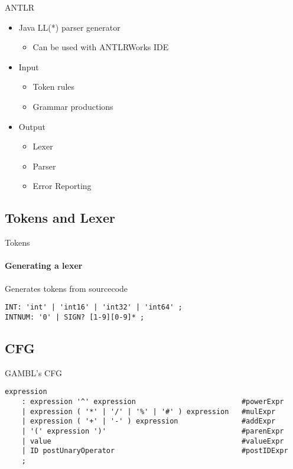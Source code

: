 \begin{frame}{ANTLR}
 \begin{itemize}
    \item Java LL(*) parser generator
    \begin{itemize}
      \item Can be used with ANTLRWorks IDE
    \end{itemize}
    \item Input
    \begin{itemize}
      \item Token rules
      \item Grammar productions
    \end{itemize}
    \item Output
    \begin{itemize}
      \item Lexer
      \item Parser
      \item Error Reporting
    \end{itemize}
  \end{itemize}
\end{frame}


\subsection{Tokens and Lexer}
\begin{frame}[fragile]{Tokens}
\framesubtitle{Generating a lexer}
 Generates tokens from sourcecode

\begin{lstlisting}[caption=Example af lexer rules in GAMBL.,frame=tlrb, basicstyle=\tiny, numbers=none]
INT: 'int' | 'int16' | 'int32' | 'int64' ;
INTNUM: '0' | SIGN? [1-9][0-9]* ;
\end{lstlisting}
\end{frame}


\subsection{CFG}
\begin{frame}[fragile]{GAMBL's CFG}
 \begin{lstlisting}[caption=Grammar rules for the expression production in GAMBL.,frame=tlrb, basicstyle=\tiny, numbers=none]
expression
    : expression '^' expression                         #powerExpr
    | expression ( '*' | '/' | '%' | '#' ) expression   #mulExpr
    | expression ( '+' | '-' ) expression               #addExpr
    | '(' expression ')'                                #parenExpr
    | value                                             #valueExpr
    | ID postUnaryOperator                              #postIDExpr
    ;
\end{lstlisting}
\end{frame}



